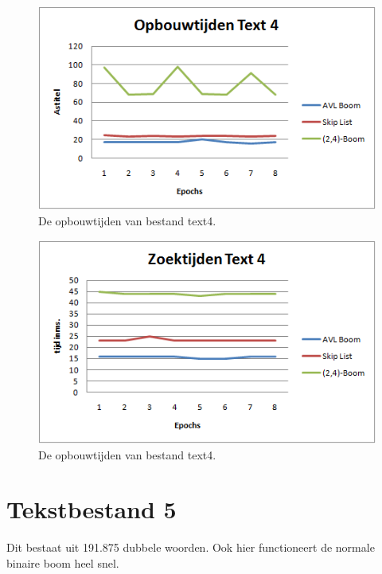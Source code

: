 \begin{figure}[h]
	\centering
		\includegraphics[width=\textwidth]{chap7/opbouwtijdtext4}
		\caption{De opbouwtijden van bestand text4.}
	\label{fig:opbouwtext4}
\end{figure}

\begin{figure}[h]
	\centering
		\includegraphics[width=\textwidth]{chap7/zoektijdtext4}
		\caption{De opbouwtijden van bestand text4.}
	\label{fig:zoektext4}
\end{figure}


\clearpage

\section{Tekstbestand 5}

Dit bestaat uit 191.875 dubbele woorden. Ook hier functioneert de normale binaire boom heel snel.

